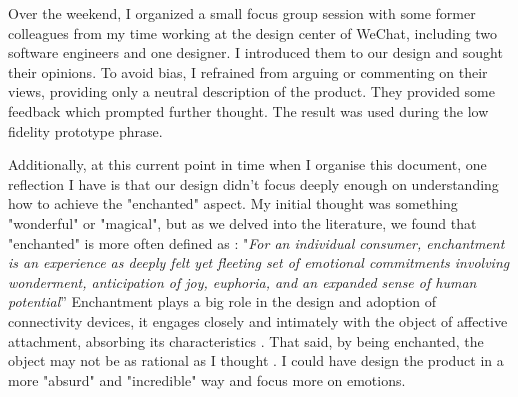 Over the weekend, I organized a small focus group session with some former colleagues from my time working at the design center of WeChat, including two software engineers and one designer. I introduced them to our design and sought their opinions. To avoid bias, I refrained from arguing or commenting on their views, providing only a neutral description of the product. They provided some feedback which prompted further thought. The result was used during the low fidelity prototype phrase.

Additionally, at this current point in time when I organise this document, one reflection I have is that our design didn't focus deeply enough on understanding how to achieve the "enchanted" aspect. My initial thought was something "wonderful" or "magical", but as we delved into the literature, we found that "enchanted" is more often defined as \cite{mccarthy2006experience}:
"\textit{For an individual consumer, enchantment is an experience as deeply felt yet fleeting set of emotional commitments involving wonderment, anticipation of joy, euphoria, and an expanded sense of human potential}” 
Enchantment plays a big role in the design and adoption of connectivity devices, it engages closely and intimately with the object of affective attachment, absorbing its characteristics . 
That said, by being enchanted, the object may not be as rational as I thought \cite{belk2021enchantment}. I could have design the product in a more  "absurd" and "incredible" way and focus more on emotions. 